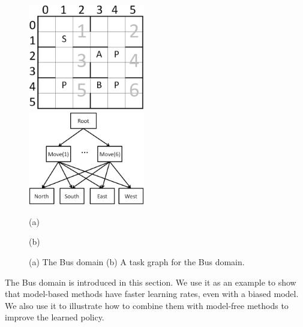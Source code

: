 \begin{figure}[t]
 \begin{minipage}[b]{0.5\linewidth}
    \begin{center}
    \includegraphics[width=2.0in] {./figures/BusSmall.eps}
\end{center}
\end{minipage}
\begin{minipage}[b]{0.5\linewidth}
    \begin{center}
    \includegraphics[width=2.0in] {./figures/BusHierarchy.eps}
\end{center}
\end{minipage}
\begin{minipage}[b]{0.5\linewidth} \centering (a) \end{minipage}
\begin{minipage}[b]{0.5\linewidth} \centering (b) \end{minipage}

\caption{(a) The Bus domain (b) A task graph for the Bus domain.}
\label{fig:bus}
\end{figure}

The Bus domain is introduced in this section. We use it as an example to show 
that model-based methods have faster learning rates, even with a biased model.
We also use it to illustrate how to combine them with model-free methods to improve the learned policy.

